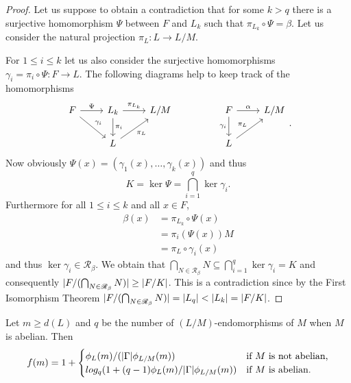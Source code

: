 \begin{proof}
    Let us suppose to obtain a contradiction that for some $k > q$ there is a surjective homomorphism $\Psi$ between $F$ and $L_k$ such that $\pi_{L_k} \circ \Psi = \beta$. 
    Let us consider the natural projection $\pi_L \colon L \rightarrow L/M$.

    For $1 \le i \le k$ let us also consider the surjective homomorphisms $\gamma_i = \pi_i \circ \Psi \colon F \rightarrow L$.
    The following diagrams help to keep track of the homomorphisms
    $$
\begin{tikzcd}
    F \arrow[r, "\Psi"] \arrow[rd, "\gamma_i"] & L_k \arrow[d, "\pi_i"] \arrow[r, "\pi_{L_k}"] & L/M &  & F \arrow[r, "\alpha"] \arrow[d, "\gamma_i"'] & L/M \\
                                               & L \arrow[ru, "\pi_L"']                        &     &  & L \arrow[ru, "\pi_L"]                        &    
    \end{tikzcd}.
    $$
    Now obviously $\Psi(x) = (\gamma_1(x), \ldots , \gamma_k(x))$ and thus
    $$K = \ker \Psi = \bigcap_{i=1}^{q} \ker \gamma_i.$$
    Furthermore for all $1 \le i \le k$ and all $x \in F$,
    \begin{align*}
        \beta(x) &= \pi_{L_k} \circ \Psi(x) \\
                  &= \pi_i(\Psi(x))M \\
                  &= \pi_L \circ \gamma_i(x) 
    \end{align*}
   and thus $\ker \gamma_i \in \mathscr{R}_\beta$.
   We obtain that $\bigcap_{N \in \mathscr{R}_\beta}N \subseteq \bigcap_{i=1}^{q} \ker \gamma_i = K$ and consequently $| F/(\bigcap_{N \in \mathscr{R}_\beta}N) | \ge | F/K |$.
   This is a contradiction since by the First Isomorphism Theorem 
    $| F/(\bigcap_{N \in \mathscr{R}_\beta}N) | = | L_q | < | L_k | = | F/K |$. 

\end{proof}

\begin{theorem}
    Let $m \ge d(L)$ and $q$ be the number of $(L/M)$-endomorphisms of $M$ when $M$ is abelian. Then 
    $$
    f(m) = 1 +
    \begin{cases}
        \phi_L(m)/(| \Gamma |\phi_{L/M}(m)) & \text{if } M \text{ is not abelian,} \\
        log_q(1+(q-1)\phi_L(m)/| \Gamma |\phi_{L/M}(m)) & \text{if } M \text{ is abelian.} \\
    \end{cases}
    $$
\end{theorem}

